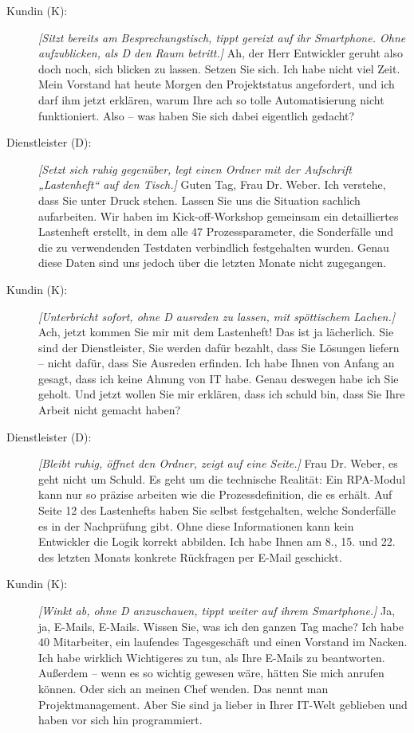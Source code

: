 \begin{description}
    \item[Kundin (K):] \textit{[Sitzt bereits am Besprechungstisch, tippt gereizt auf ihr Smartphone. Ohne aufzublicken, als D den Raum betritt.]} Ah, der Herr Entwickler geruht also doch noch, sich blicken zu lassen. Setzen Sie sich. Ich habe nicht viel Zeit. Mein Vorstand hat heute Morgen den Projektstatus angefordert, und ich darf ihm jetzt erklären, warum Ihre ach so tolle Automatisierung nicht funktioniert. Also – was haben Sie sich dabei eigentlich gedacht?
    
    \item[Dienstleister (D):] \textit{[Setzt sich ruhig gegenüber, legt einen Ordner mit der Aufschrift „Lastenheft“ auf den Tisch.]} Guten Tag, Frau Dr. Weber. Ich verstehe, dass Sie unter Druck stehen. Lassen Sie uns die Situation sachlich aufarbeiten. Wir haben im Kick-off-Workshop gemeinsam ein detailliertes Lastenheft erstellt, in dem alle 47 Prozessparameter, die Sonderfälle und die zu verwendenden Testdaten verbindlich festgehalten wurden. Genau diese Daten sind uns jedoch über die letzten Monate nicht zugegangen.
    
    \item[Kundin (K):] \textit{[Unterbricht sofort, ohne D ausreden zu lassen, mit spöttischem Lachen.]} Ach, jetzt kommen Sie mir mit dem Lastenheft! Das ist ja lächerlich. Sie sind der Dienstleister, Sie werden dafür bezahlt, dass Sie Lösungen liefern – nicht dafür, dass Sie Ausreden erfinden. Ich habe Ihnen von Anfang an gesagt, dass ich keine Ahnung von IT habe. Genau deswegen habe ich Sie geholt. Und jetzt wollen Sie mir erklären, dass ich schuld bin, dass Sie Ihre Arbeit nicht gemacht haben?
    
    \item[Dienstleister (D):] \textit{[Bleibt ruhig, öffnet den Ordner, zeigt auf eine Seite.]} Frau Dr. Weber, es geht nicht um Schuld. Es geht um die technische Realität: Ein \acs{RPA}-Modul kann nur so präzise arbeiten wie die Prozessdefinition, die es erhält. Auf Seite 12 des Lastenhefts haben Sie selbst festgehalten, welche Sonderfälle es in der Nachprüfung gibt. Ohne diese Informationen kann kein Entwickler die Logik korrekt abbilden. Ich habe Ihnen am 8., 15. und 22. des letzten Monats konkrete Rückfragen per E-Mail geschickt.
    
    \item[Kundin (K):] \textit{[Winkt ab, ohne D anzuschauen, tippt weiter auf ihrem Smartphone.]} Ja, ja, E-Mails, E-Mails. Wissen Sie, was ich den ganzen Tag mache? Ich habe 40 Mitarbeiter, ein laufendes Tagesgeschäft und einen Vorstand im Nacken. Ich habe wirklich Wichtigeres zu tun, als Ihre E-Mails zu beantworten. Außerdem – wenn es so wichtig gewesen wäre, hätten Sie mich anrufen können. Oder sich an meinen Chef wenden. Das nennt man Projektmanagement. Aber Sie sind ja lieber in Ihrer IT-Welt geblieben und haben vor sich hin programmiert.
    

\end{description}
